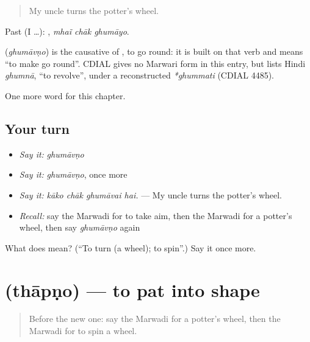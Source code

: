 \begin{quote}
My uncle turns the potter's wheel.
\end{quote}

Past (I …):   , \emph{mhaĩ chāk ghumāyo}.

\begin{cousinweb}
\textbf{} (\emph{ghumāvṇo}) is the causative of \textbf{}, to go round: it is built on that verb and means \textquotedblleft{}to make go round\textquotedblright{}. CDIAL gives no Marwari form in this entry, but lists Hindi \emph{ghumnā}, \textquotedblleft{}to revolve\textquotedblright{}, under a reconstructed \emph{*ghummati} (CDIAL 4485).
\end{cousinweb}

\begin{grammarlens}[title={What you've built}]
One more word for this chapter.
\end{grammarlens}

\subsection*{Your turn}
\begin{itemize}
\raggedright
  \item \emph{Say it:} \emph{ghumāvṇo}
  \item \emph{Say it:} \emph{ghumāvṇo}, once more
  \item \emph{Say it:} \emph{kāko chāk ghumāvai hai.} — My uncle turns the potter's wheel.
  \item \emph{Recall:} say the Marwadi for to take aim, then the Marwadi for a potter's wheel, then say \emph{ghumāvṇo} again
\end{itemize}

\begin{tcolorbox}[breakable,colback=teal!4,colframe=teal!35!black,title={Before you move on}]
What does  mean? (\textquotedblleft{}To turn (a wheel); to spin\textquotedblright{}.) Say it once more.
\end{tcolorbox}
\section[\texorpdfstring{\mw{थापणो} (thāpṇo)}{थापणो (thāpṇo)}]{ (thāpṇo) — to pat into shape}

\label{lesson:MW-C281-thapno}



\begin{quote}
Before the new one: say the Marwadi for a potter's wheel, then the Marwadi for to spin a wheel.
\end{quote}

